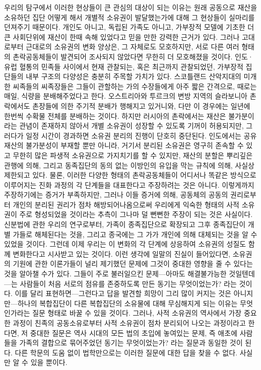 우리의 탐구에서 이러한 현상들이 큰 관심의 대상이 되는 이유는
원래 공동으로 재산을 소유하던 집단 
어떻게 해서 개별적 소유권이 발달했는가에 대해
그 현상들이 실마리를 던져주기 때문이다.
개인도 아니고,
독립된 가족도 아니고,
가부장적 모델에 기초한 더 큰 사회단위에
재산이 한때 속해 있었다고 믿을 만한 강력한 근거가 있다.
그러나
고대로부터 근대로의 소유권의 변화 양상은,
그 자체로도 모호하지만,
서로 다른 여러 형태의 촌락공동체들이 발견되어 조사되지 않았다면
무한히 더 모호해졌을 것이다.
인도^^b7유럽 혈통의 민족들 사이에서
현재 관찰되는, 혹은 최근까지 관찰되었던,
가부장적 집단들의 내부 구조의 다양성은 충분히 주목할 가치가 있다.
스코틀랜드 산악지대의 미개한 씨족들의 씨족장들은
그들이 관할하는 가의 수장들에게
아주 짧은 간격으로, 때로는 매일,
식량을 분배해주었다고 한다.
오스트리아와 투르크의 변방 지역의 슬라보니아 촌락에서도
촌장들에 의한 주기적 분배가 행해지고 있거니와, 다만
이 경우에는 일년에 한번씩 수확물 전체를 분배하는 것이다.
하지만 러시아의 촌락에서는
재산은 불가분이라는 관념이 존재하지 않아서
개별 소유권이 성장할 수 있도록 기꺼이 허용되지만,
그러다가 일정 시간이 경과하면 소유권 분리의 진행이 단호히 중단된다.
인도에서는 공유재산의 불가분성이 부재할 뿐만 아니라,
거기서 분리된 소유권은 영구히 존속할 수 있고
무한히 많은 파생적 소유권으로 가지치기를 할 수 있지만,
재산의 분할은
뿌리깊은 관행에 의해,
그리고 동족집단의 동의 없는 이방인의 유입을 막는 규칙에 의해,
사실상
제한되고 있다.
물론,
이러한 다양한 형태의 촌락공동체들이
어디서나 똑같은 방식으로 이루어지는 진화 과정의
각 단계들을 대표한다고 주장하려는 것은 아니다.
이렇게까지 주장하기에는 증거가 부족하지만,
그러나
이들 증거에 의해,
공동체의 공동의 권리로부터
개인의 분리된 권리가 점차 해방되어나옴으로써
우리에게 익숙한 형태의 사적 소유권이
주로 형성되었을 것이라는 추측이
그나마 덜 뻔뻔한 주장이 되는 것은 사실이다.
신분법에 관한 우리의 연구로부터,
가족이 종족집단으로 확장되고
그후 종족집단이 개별 가들로 해체된다는 것을,
그리고 종국에는
그 가가 개인에 의해 대체되는 것을
알 수 있었을 것이다.
그런데
이제 우리는 이 변화의 각 단계에 상응하여
소유권의 성질도 함께 변화한다고 시사받고 있는 것이다.
이런 생각에 일말의 진실이 들어있다면,
소유권의 기원에 관한 이론가들이 널리 제기했던 문제에
그것이
중대한 영향을 줄 수 있다는 것을 알아챌 수가 있다.
그들이 주로 불러일으킨 문제---아마도 해결불가능한 것일텐데---는
사람들이 처음 서로의 점유를 존중하도록 만든 동기는 무엇이었는가? 라는 것이다.
이를 달리 표현하면---그런다고 답을 발견할 희망이 그리 많이 커지는 것은
아니지만---하나의 복합집단이 다른 복합집단의 소유물에 대해
무심해지게 되는 이유는 무엇인가라는 질문 형태로 바꿀 수 있을 것이다.
그러나,
사적 소유권의 역사에서 가장 중요한 과정이
친족의 공동소유로부터 사적 소유권이 점차 분리되어 나오는 과정이라고 한다면,
저 중대한 질문은 역사 시대의 모든 법의 초입에 놓여있는 문제, 즉
애초에 사람들을 가족의 결합으로 묶어주었던 동기는 무엇이었는가? 라는 질문과
동일한 것이 된다.
다른 학문의 도움 없이 법학만으로는 이러한 질문에 대한 답을 찾을 수 없다.
사실만 알 수 있을 뿐이다.

